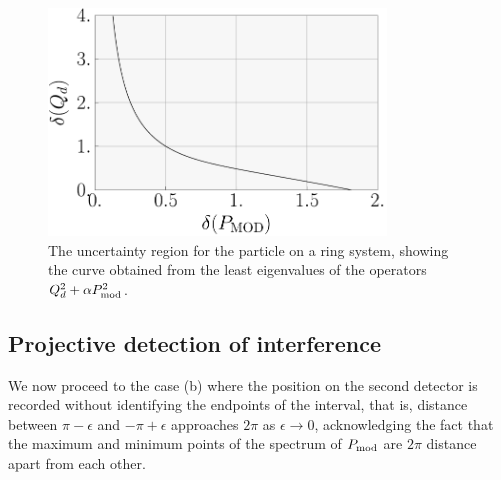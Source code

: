 \begin{figure}
  \centering
  \includegraphics[width=0.8\textwidth]{ring-ur}
  \caption{The uncertainty region for the particle on a ring system, showing the curve obtained from the least eigenvalues of the operators $Q_d^2 + \alpha P_{\mathrm{mod}}^2$.}
  \label{fig:ring-ur}
\end{figure}

\subsection{Projective detection of interference}

We now proceed to the case (b) where the position on the second detector is recorded without identifying the endpoints of the interval, that is, distance between $\pi-\epsilon$ and $-\pi+\epsilon$ approaches $2\pi$ as $\epsilon\rightarrow 0$, acknowledging the fact that the maximum and minimum points of the spectrum of $P_{\mathrm{mod}}$ are $2\pi$ distance apart from each other.

